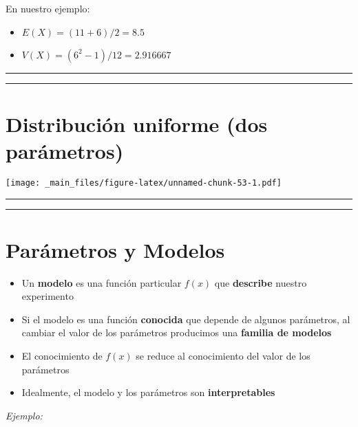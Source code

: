 \documentclass[
]{book}
\providecommand{\tightlist}{%
  \setlength{\itemsep}{0pt}\setlength{\parskip}{0pt}}
\begin{document}
En nuestro ejemplo:

\begin{itemize}
\tightlist
\item
  \(E(X)=(11+6)/2=8.5\)
\item
  \(V(X)=(6^2-1)/12=2.916667\)
\end{itemize}

\begin{center}\rule{0.5\linewidth}{0.5pt}\end{center}

\begin{center}\rule{0.5\linewidth}{0.5pt}\end{center}

\hypertarget{distribuciuxf3n-uniforme-dos-paruxe1metros-2}{%
\section{Distribución uniforme (dos parámetros)}\label{distribuciuxf3n-uniforme-dos-paruxe1metros-2}}

\texttt{[image: \_main\_files/figure-latex/unnamed-chunk-53-1.pdf]}

\begin{center}\rule{0.5\linewidth}{0.5pt}\end{center}

\begin{center}\rule{0.5\linewidth}{0.5pt}\end{center}

\hypertarget{paruxe1metros-y-modelos}{%
\section{Parámetros y Modelos}\label{paruxe1metros-y-modelos}}

\begin{itemize}
\item
  Un \textbf{modelo} es una función particular \(f(x)\) que \textbf{describe} nuestro experimento
\item
  Si el modelo es una función \textbf{conocida} que depende de algunos parámetros, al cambiar el valor de los parámetros producimos una \textbf{familia de modelos}
\item
  El conocimiento de \(f(x)\) se reduce al conocimiento del valor de los parámetros
\item
  Idealmente, el modelo y los parámetros son \textbf{interpretables}
\end{itemize}

\emph{Ejemplo:}
\end{document}
